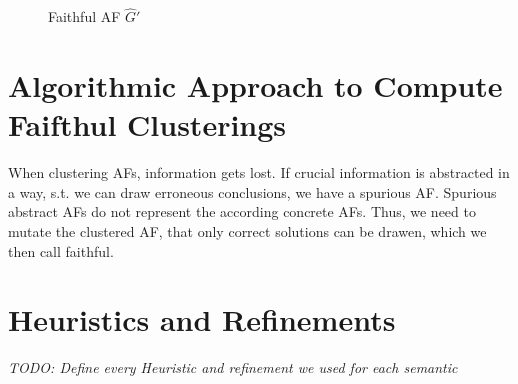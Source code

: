 \begin{figure}[H]
    \centering
    \caption{Faithful AF $\hat{G}'$}
    \label{af:algorithmConcretizer4}
\end{figure}




\newpage

\section{Algorithmic Approach to Compute Faifthul Clusterings}
\label{sec:AlgorithmicApproachToComputeFaifthulClusterings}
When clustering AFs, information gets lost. If crucial information is abstracted in a way, s.t. we can draw erroneous conclusions, we have a spurious AF. Spurious abstract AFs do not represent the according concrete AFs. Thus, we need to mutate the clustered AF, that only correct solutions can be drawen, which we then call faithful.

\section{Heuristics and Refinements}
\label{sec:HeuristicsAndRefinements}
\textit{TODO: Define every Heuristic and refinement we used for each semantic}
